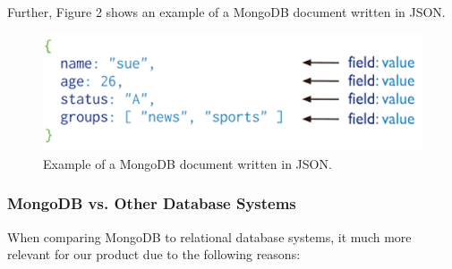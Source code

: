 \documentclass[titlepage, 12pt]{article}
\begin{document}
Further, Figure 2 shows an example of a MongoDB document written in JSON.

\begin{figure}[h]
    \centering\includegraphics[width=0.75\linewidth]{images/mongodb-example.png}
    \caption{Example of a MongoDB document written in JSON.}
\end{figure}


\subsubsection{MongoDB vs. Other Database Systems}

When comparing MongoDB to relational database systems, it much more relevant for our product due to the following reasons:
\end{document}
